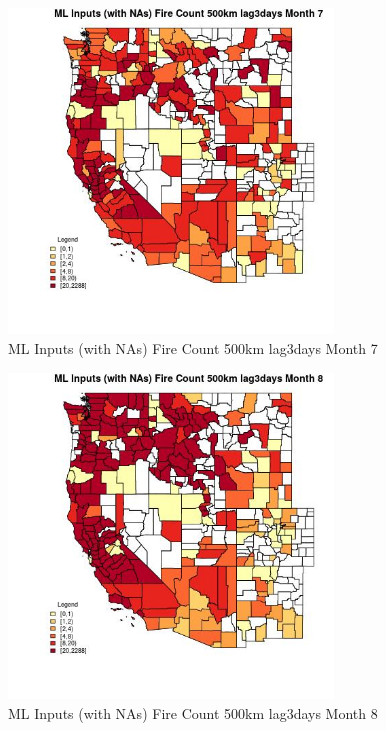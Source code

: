 \begin{figure} 
\centering  
\includegraphics[width=0.77\textwidth]{Code_Outputs/Report_ML_input_PM25_Step4_part_e_de_duplicated_aves_compiled_2019-05-20wNAs_CountyFire_Count_500km_lag3daysmedianMonth7.jpg} 
\caption{\label{fig:Report_ML_input_PM25_Step4_part_e_de_duplicated_aves_compiled_2019-05-20wNAsCountyFire_Count_500km_lag3daysmedianMonth7}ML Inputs (with NAs) Fire Count 500km lag3days Month 7} 
\end{figure} 
 

\begin{figure} 
\centering  
\includegraphics[width=0.77\textwidth]{Code_Outputs/Report_ML_input_PM25_Step4_part_e_de_duplicated_aves_compiled_2019-05-20wNAs_CountyFire_Count_500km_lag3daysmedianMonth8.jpg} 
\caption{\label{fig:Report_ML_input_PM25_Step4_part_e_de_duplicated_aves_compiled_2019-05-20wNAsCountyFire_Count_500km_lag3daysmedianMonth8}ML Inputs (with NAs) Fire Count 500km lag3days Month 8} 
\end{figure} 
 

